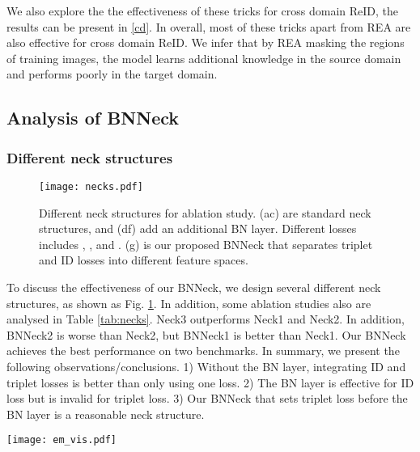 \documentclass[journal]{IEEEtran}
\begin{document}
We also explore the the effectiveness of these tricks for cross domain ReID, the results can be present in \ref{cd}.
In overall, most of these tricks apart from REA are also effective for cross domain ReID.
We infer that by REA masking the regions of training images, the model learns additional knowledge in the source domain and performs poorly in the target domain.

\subsection{Analysis of BNNeck}\label{sec:bnneck}

\subsubsection{Different neck structures}
\begin{figure}[tb]
\centering
\texttt{[image: necks.pdf]}
\caption{Different neck structures for ablation study. (ac) are standard neck structures, and (df) add an additional BN layer. Different losses includes , , and .
(g) is our proposed BNNeck that separates triplet and ID losses into different feature spaces.}
\label{fig:necks}
\end{figure}


To discuss the effectiveness of our BNNeck, we design several different neck structures, as shown as Fig. \ref{fig:necks}.
In addition, some ablation studies also are analysed in Table \ref{tab:necks}.
Neck3 outperforms Neck1 and Neck2. In addition, BNNeck2 is worse than Neck2, but BNNeck1 is better than Neck1. Our BNNeck achieves the best performance on two benchmarks. In summary, we present the following observations/conclusions.
1) Without the BN layer, integrating ID and triplet losses is better than only using one loss.
2) The BN layer is effective for ID loss but is invalid for triplet loss.
3) Our BNNeck that sets triplet loss before the BN layer is a reasonable neck structure.

\begin{figure*}[htb]
\vspace{-2mm}
\centering
\texttt{[image: em\_vis.pdf]}
\vspace{-3mm}
\caption{2D visualization of feature distribution in the embedding space supervised by different losses and neck structures on MNIST dataset. (af) correspond to (af) in Figs. \ref{fig:necks}. (g) and (h) are related to Fig. \ref{fig:necks}(g). The feature dimension is set to 2 for the best view. The BN layer will smoothen the feature.}
\label{fig:vis}
\vspace{-2mm}
\end{figure*}
\end{document}
